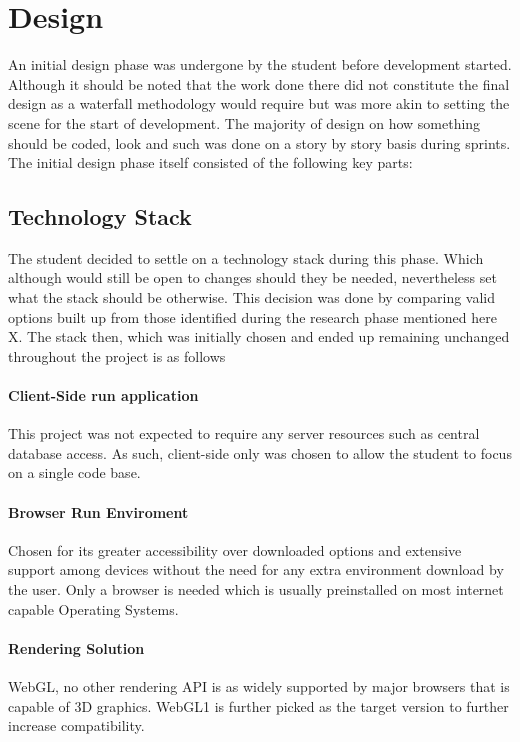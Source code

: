 \section{Design}
An initial design phase was undergone by the student before development started. Although it should be noted that the work done there did not constitute the final design as a waterfall methodology would require but was more akin to setting the scene for the start of development. The majority of design on how something should be coded, look and such was done on a story by story basis during sprints.
The initial design phase itself consisted of the following key parts:

\subsection{Technology Stack}
The student decided to settle on a technology stack during this phase. Which although would still be open to changes should they be needed, nevertheless set what the stack should be otherwise. This decision was done by comparing valid options built up from those identified during the research phase mentioned here X.
The stack then, which was initially chosen and ended up remaining unchanged throughout the project is as follows

\paragraph{Client-Side run application}
This project was not expected to require any server resources such as central database access. As such, client-side only was chosen to allow the student to focus on a single code base.

\paragraph{Browser Run Enviroment}
Chosen for its greater accessibility over downloaded options and extensive support among devices without the need for any extra environment download by the user. Only a browser is needed which is usually preinstalled on most internet capable Operating Systems.

\paragraph{Rendering Solution}
WebGL, no other rendering API is as widely supported by major browsers that is capable of 3D graphics. WebGL1 is further picked as the target version to further increase compatibility.

